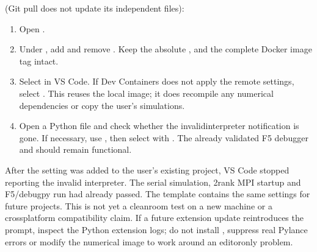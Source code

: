 \documentclass[letterpaper,10pt,english]{sphinxmanual}
\begin{document}
\sphinxAtStartPar
{} (Git pull does not update its
independent files):
\begin{enumerate}
%
\item {} 
\sphinxAtStartPar
Open .

\item {} 
\sphinxAtStartPar
Under , add
and remove .
Keep the absolute ,
 and the complete Docker
image tag intact.

\item {} 
\sphinxAtStartPar
Select  in VS Code. If
Dev Containers does not apply the remote settings, select
.
This reuses the local image; it does  recompile any
numerical dependencies or copy the user’s simulations.

\item {} 
\sphinxAtStartPar
Open a Python file and check whether the invalid\sphinxhyphen{}interpreter
notification is gone. If necessary, use
, then
select  with
. The already validated
F5 debugger and  should remain functional.

\end{enumerate}

\sphinxAtStartPar
{} After the
setting was added to the user’s existing project, VS Code stopped
reporting the invalid interpreter. The serial simulation, 2\sphinxhyphen{}rank
MPI startup and F5/debugpy run had already passed. The template
contains the same settings for future projects. This is not
yet a clean\sphinxhyphen{}room test on a new machine or a cross\sphinxhyphen{}platform
compatibility claim. If a future extension update reintroduces
the prompt, inspect the Python extension logs; do not install
, suppress real Pylance errors or modify the numerical
image to work around an editor\sphinxhyphen{}only problem.
\end{document}
